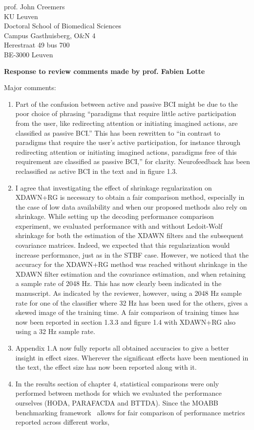 \documentclass{letter}
\newcommand{\reply}[1]{%
	\textbf{Response to review comments made by prof. #1}

}
\begin{document}
\begin{letter}{%
	prof. John Creemers \\
	KU Leuven \\
	Doctoral School of Biomedical Sciences \\
	Campus Gasthuisberg, O\&N 4 \\
	Herestraat 49 bus 700 \\
	BE-3000 Leuven

}
\reply{Fabien Lotte}
Major comments:
\begin{enumerate}
	\item Part of the confusion between active and passive BCI might be due
	to the poor choice of phrasing ``paradigms that require little active
  participation from the user, like redirecting attention or initiating imagined actions, are classified as passive BCI.''
	This has been rewritten to ``in contrast to paradigms that require the user's active participation, for
	instance through redirecting attention or initiating imagined actions,
	paradigms free of this requirement are classified as passive BCI,''
	for clarity.
	Neurofeedback has been reclassified as active BCI in the text and in
	figure 1.3.
	\item I agree that investigating the effect of shrinkage
    regularization on XDAWN+RG is necessary to obtain a fair comparison method,
    especially in the case of low data availability and when our proposed
    methods also rely on shrinkage.
    While setting up the decoding performance comparison experiment, we
    evaluated performance with and without Ledoit-Wolf shrinkage for both the
    estimation of the XDAWN filters and the subsequent covariance matrices.
    Indeed, we expected that this regularization would increase performance,
    just as in the STBF case. However, we noticed that the accuracy for the
    XDAWN+RG method was reached without shrinkage in the XDAWN filter
    estimation and the covariance estimation, and when retaining a sample rate
    of 2048 Hz.
    This has now clearly been indicated in the manuscript.
    As indicated by the reviewer, however, using a 2048 Hz sample rate for one of the
    classifier where 32 Hz has been used for the others, gives a skewed image
    of the training time.
    A fair comparison of training times has now been reported in section 1.3.3 and figure 1.4
    with XDAWN+RG also using a 32 Hz sample rate.
  \item Appendix 1.A now fully reports all obtained accuracies to give a better
    insight in effect sizes. Wherever the significant effects have been mentioned
    in the text, the effect size has now been reported along with it.
	\item In the results section of chapter 4, statistical comparisons were
	only performed between methods for which we evaluated the performance
	ourselves (HODA, PARAFACDA and BTTDA).
	Since the MOABB benchmarking framework~\cite{Aristimunha2023} allows for
	fair comparison of performance metrics reported across different works,

\end{enumerate}
\end{letter}
\end{document}
